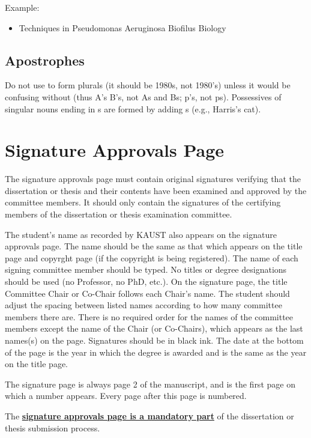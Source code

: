 Example:

\begin{itemize}
\item Techniques in Pseudomonas Aeruginosa Biofilus Biology

\end{itemize}

\subsection{Apostrophes}

Do not use to form plurals (it should be 1980s, not 1980's) unless it would be confusing without (thus A's B's, not As and Bs; p's, not ps).  Possessives of singular nouns ending in s are formed by adding s (e.g., Harris's cat).

\section{Signature Approvals Page}

The signature approvals page must contain original signatures verifying that the dissertation or thesis and their contents have been examined and approved by the committee members. It should only contain the signatures of the certifying members of the dissertation or thesis examination committee.

The student's name as recorded by KAUST also appears on the signature approvals page. The name should be the same as that which appears on the title page and copyrght page (if the copyright is being registered). The name of each signing committee member should be typed. No titles or degree designations should be used (no Professor, no PhD, etc.). On the signature page, the title Committee Chair or Co-Chair follows each Chair's name. The student should adjust the spacing between listed names according to how many committee members there are.  There is no required order for the names of the committee members except the name of the Chair (or Co-Chairs), which appears as the last names(s) on the page. Signatures should be in black ink. The date at the bottom of the page is the year in which the degree is awarded and is the same as the year on the title page.

The signature page is always page 2 of the manuscript, and is the first page on which a number appears. Every page after this page is numbered.

The \underline{\textbf{signature approvals page is a mandatory part}} of the dissertation or thesis submission process.

